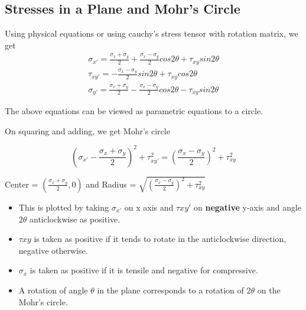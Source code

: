 \documentclass{article}
\begin{document}
	\subsection{Stresses in a Plane and Mohr's Circle}
	Using physical equations or using cauchy's stress tensor with rotation matrix, we get
	\begin{gather}
		\sigma_{x'} = \frac{\sigma_x + \sigma_y}{2} + \frac{\sigma_x - \sigma_y}{2} cos2\theta + \tau_{xy} sin2\theta \\
		\tau_{xy'} = -\frac{\sigma_x - \sigma_y}{2} sin2\theta + \tau_{xy} cos2\theta \\
		\sigma_{y'} = \frac{\sigma_x + \sigma_y}{2} - \frac{\sigma_x - \sigma_y}{2} cos2\theta - \tau_{xy} sin2\theta
	\end{gather}

	The above equations can be viewed as parametric equations to a circle.

	On squaring and adding, we get Mohr's circle

	\[\left(\sigma_{x'} -\frac{\sigma_x+\sigma_y}{2} \right)^2 + \tau_{xy'}^2 = \left(\frac{\sigma_x - \sigma_y}{2}\right)^2 + \tau_{xy}^2 \] 

	Center = $(\frac{\sigma_x+\sigma_y}{2},0)$ and 
	Radius = $\sqrt{\left(\frac{\sigma_x - \sigma_y}{2}\right)^2 + \tau_{xy}^2}$\\

	\begin{itemize}
		\item This is plotted by taking $\sigma_{x'}$ on x axis and $\tau{xy'}$ on \textbf{negative} y-axis and angle $2\theta$ anticlockwise as positive.\\
		\item $\tau{xy}$ is taken as positive if it tends to rotate in the anticlockwise direction, negative otherwise.
		\item $\sigma_x$ is taken as positive if it is tensile and negative for compressive.
		\item A rotation of angle $\theta$ in the plane corresponds to a rotation of $2\theta$ on the Mohr's circle.
	\end{itemize}
\end{document}
